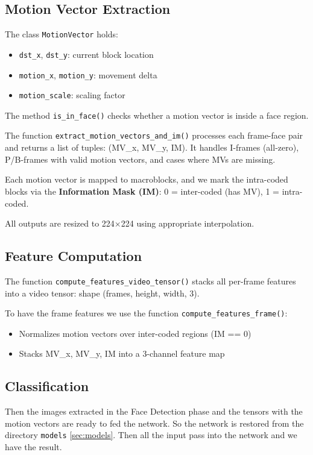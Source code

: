 \documentclass[a4paper,12pt]{article}
\begin{document}
\subsection{Motion Vector Extraction}

The class \texttt{MotionVector} holds:
\begin{itemize}
  \item \texttt{dst\_x}, \texttt{dst\_y}: current block location
  \item \texttt{motion\_x}, \texttt{motion\_y}: movement delta
  \item \texttt{motion\_scale}: scaling factor
\end{itemize}

The method \texttt{is\_in\_face()} checks whether a motion vector is inside a face region.

The function \texttt{extract\_motion\_vectors\_and\_im()} processes each frame-face pair and returns a list of tuples: (MV\_x, MV\_y, IM). It handles I-frames (all-zero), P/B-frames with valid motion vectors, and cases where MVs are missing.

Each motion vector is mapped to macroblocks, and we mark the intra-coded blocks via the \textbf{Information Mask (IM)}: 0 = inter-coded (has MV), 1 = intra-coded.

All outputs are resized to 224×224 using appropriate interpolation.

\subsection{Feature Computation}

The function \texttt{compute\_features\_video\_tensor()} stacks all per-frame features into a video tensor: shape (frames, height, width, 3).


To have the frame features we use the function \texttt{compute\_features\_frame()}:
\begin{itemize}
  \item Normalizes motion vectors over inter-coded regions (IM == 0)
  \item Stacks MV\_x, MV\_y, IM into a 3-channel feature map
\end{itemize}

\subsection{Classification}
Then the images extracted in the Face Detection phase and the tensors with the motion vectors are ready to fed the network. So the network is restored from the directory \texttt{models} \ref{sec:models}. Then all the input pass into the network and we have the result.
\end{document}
